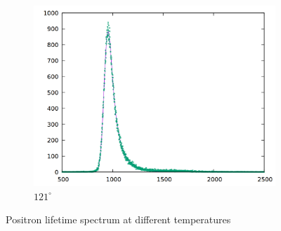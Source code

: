 \begin{figure}
\begin{subfigure}[h]{0.49\textwidth}
    \includegraphics[width=\textwidth]{data/temp/na_121.png}
    \caption{$121^\circ$}
  \end{subfigure}
  \caption{Positron lifetime spectrum at different temperatures}
\end{figure} 